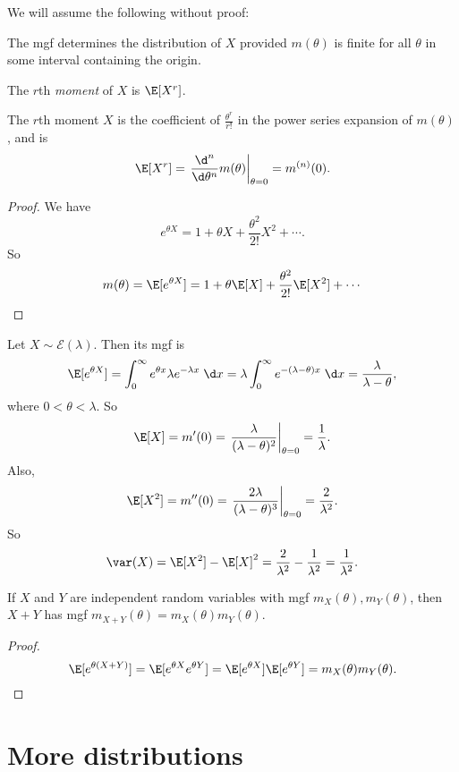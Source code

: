 \documentclass[a4paper]{article}
\begin{document}
We will assume the following without proof:
\begin{thm}
  The mgf determines the distribution of $X$ provided $m(\theta)$ is finite for all $\theta$ in some interval containing the origin.
\end{thm}

\begin{defi}[Moment]
  The $r$th \emph{moment} of $X$ is $\E[X^r]$.
\end{defi}

\begin{thm}
  The $r$th moment $X$ is the coefficient of $\frac{\theta^r}{r!}$ in the power series expansion of $m(\theta)$, and is
  \[
    \E[X^r] = \left.\frac{\d ^n}{\d \theta^n}m(\theta)\right|_{\theta = 0} = m^{(n)}(0).
  \]
\end{thm}

\begin{proof}
  We have
  \[
    e^{\theta X} = 1 + \theta X + \frac{\theta^2}{2!}X^2 + \cdots.
  \]
  So
  \[
    m(\theta) = \E[e^{\theta X}] = 1 + \theta \E[X] + \frac{\theta^2}{2!}\E [X^2] + \cdots
  \]
\end{proof}

\begin{eg}
  Let $X\sim \mathcal{E}(\lambda)$. Then its mgf is
  \[
    \E[e^{\theta X}] = \int_0^\infty e^{\theta x}\lambda e^{-\lambda x}\;\d x = \lambda\int_0^\infty e^{-(\lambda - \theta )x}\;\d x = \frac{\lambda}{\lambda - \theta},
  \]
  where $0 < \theta < \lambda$. So
  \[
    \E[X] = m'(0) = \left.\frac{\lambda}{(\lambda - \theta)^2}\right|_{\theta = 0} = \frac{1}{\lambda}.
  \]
  Also,
  \[
    \E[X^2] = m''(0) = \left.\frac{2\lambda}{(\lambda - \theta)^3}\right|_{\theta = 0} = \frac{2}{\lambda^2}.
  \]
  So
  \[
    \var(X) = \E[X^2] - \E[X]^2 = \frac{2}{\lambda^2} - \frac{1}{\lambda^2} = \frac{1}{\lambda^2}.
  \]
\end{eg}

\begin{thm}
  If $X$ and $Y$ are independent random variables with mgf $m_X(\theta), m_Y(\theta)$, then $X + Y$ has mgf $m_{X + Y}(\theta) = m_X(\theta)m_Y(\theta)$.
\end{thm}

\begin{proof}
  \[
    \E[e^{\theta(X + Y)}] = \E[e^{\theta X}e^{\theta Y}] = \E[e^{\theta X}]\E[e^{\theta Y}] = m_X(\theta)m_Y(\theta).
  \]
\end{proof}
\section{More distributions}
\end{document}

